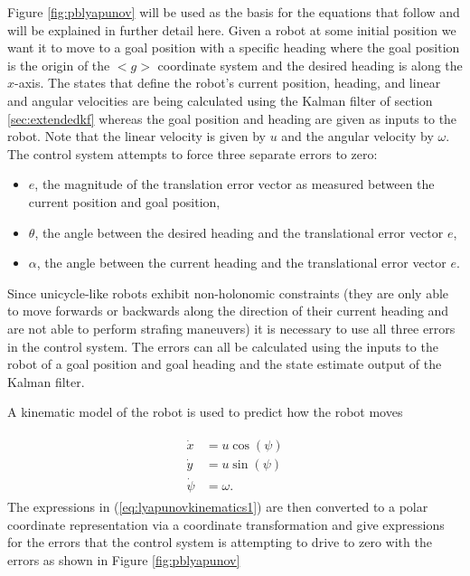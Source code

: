 Figure \ref{fig:pblyapunov} will be used as the basis for the equations that follow and will be explained in further detail here. Given a robot at some initial position we want it to move to a goal position with a specific heading where the goal position is the origin of the $<g>$ coordinate system and the desired heading is along the $x$-axis. The states that define the robot's current position, heading, and linear and angular velocities are being calculated using the Kalman filter of section \ref{sec:extendedkf} whereas the goal position and heading are given as inputs to the robot. Note that the linear velocity is given by $u$ and the angular velocity by $\omega$. The control system attempts to force three separate errors to zero:
\begin{itemize}
\item $e$, the magnitude of the translation error vector as measured between the current position and goal position,
\item $\theta$, the angle between the desired heading and the translational error vector $e$,
\item $\alpha$, the angle between the current heading and the translational error vector $e$.
\end{itemize}

Since unicycle-like robots exhibit non-holonomic constraints (they are only able to move forwards or backwards along the direction of their current heading and are not able to perform strafing maneuvers) it is necessary to use all three errors in the control system. The errors can all be calculated using the inputs to the robot of a goal position and goal heading and the state estimate output of the Kalman filter.

A kinematic model of the robot is used to predict how the robot moves

\begin{align}
\label{eq:lyapunovkinematics1}
\begin{split}
\dot{x} &= u\cos(\psi) \\
\dot{y} &= u\sin(\psi) \\
\dot{\psi} &= \omega.
\end{split}
\end{align}
The expressions in (\ref{eq:lyapunovkinematics1}) are then converted to a polar coordinate representation via a coordinate transformation and give expressions for the errors that the control system is attempting to drive to zero with the errors as shown in Figure \ref{fig:pblyapunov}


